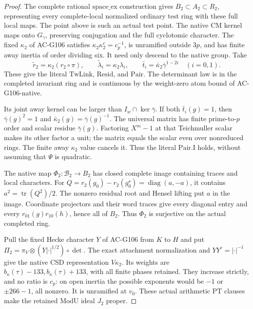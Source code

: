 \begin{proof}
The complete rational \(\mathrm{space\_ex}\) construction
gives \(B_2\subset A_2\subset R_2\), representing every
complete-local normalized ordinary test ring with these
full local maps.  The point above is such an actual test
point.  The native CM kernel maps onto \(G_\gamma\),
preserving conjugation and the full cyclotomic character.
The fixed \(\kappa_2\) of AC-G106 satisfies
\(\kappa_2\kappa_2^c=c_p^{-1}\), is unramified outside
\(3p\), and has finite away inertia of order dividing six.
It need only descend to the native group.  Take
\[
 \widetilde r_2=\kappa_2(r_2\circ\pi),\qquad
 \widetilde\lambda_i=\kappa_2\lambda_i,\qquad
 \bar t_i=\bar\kappa_2\bar\gamma^{1-2i}\quad(i=0,1).
 \tag{G138.29}
\]
These give the literal \(\mathrm{TwLink}\), \(\mathrm{Resid}\),
and \(\mathrm{Pair}\).  The determinant law is in the
completed invariant ring and is continuous by the
weight-zero atom bound of AC-G106-native.

Its joint away kernel can be larger than
\(I_w\cap\ker\bar\gamma\).  If both \(\bar t_i(g)=1\),
then \(\bar\gamma(g)^2=1\) and
\(\bar\kappa_2(g)=\bar\gamma(g)^{-1}\).
The universal matrix has finite prime-to-\(p\) order and
scalar residue \(\bar\gamma(g)\).  Factoring \(X^m-1\)
at that Teichmuller scalar makes its other factor a unit;
the matrix equals the scalar even over nonreduced rings.
The finite away \(\kappa_2\) value cancels it.  Thus the
literal \(\mathrm{Pair.I}\) holds, without assuming that
\(\Psi\) is quadratic.

The native map \(\Phi_2:\mathcal B_2\to B_2\) has closed
complete image containing traces and local characters.
For \(Q=r_2(g_0)-r_2(g_0^\star)=\operatorname{diag}(a,-a)\),
it contains \(a^2=\operatorname{tr}(Q^2)/2\).
The nonzero residual root and Hensel lifting put \(a\) in
the image.  Coordinate projectors and their word traces
give every diagonal entry and every
\(r_{01}(g)r_{10}(h)\), hence all of \(B_2\).
Thus \(\Phi_2\) is surjective on the actual completed ring.

Pull the fixed Hecke character \(Y\) of AC-G106 from \(K\)
to \(H\) and put
\(\Pi_2=\pi_V\otimes(Y|\cdot|^{1/2})\circ\det\).
The exact attachment normalization and
\(YY^c=|\cdot|^{-1}\) give the native CSD representation
\(V\kappa_2\).  Its weights are
\(b_\kappa(\tau)-133,b_\kappa(\tau)+133\), with all finite
phases retained.  They increase strictly, and no ratio
is \(c_p\): on open inertia the possible exponents would
be \(-1\) or \(\pm266-1\), all nonzero.
It is unramified at \(v_0\).  These actual arithmetic
\(\mathrm{PT}\) clauses make the retained \(\mathrm{ModU}\)
ideal \(J_2\) proper.


\end{proof}
